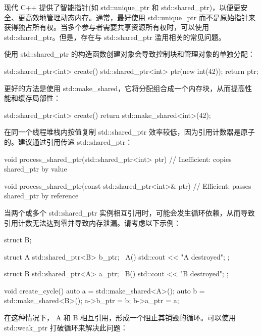 
现代 C++ 提供了智能指针(如 std::unique\_ptr 和 std::shared\_ptr)，以便更安全、更高效地管理动态内存。通常，最好使用 std::unique\_ptr 而不是原始指针来获得独占所有权。当多个参与者需要共享资源所有权时，可以使用 std::shared\_ptr。但是，存在与 std::shared\_ptr 滥用相关的常见问题。


使用 std::shared\_ptr 的构造函数创建对象会导致控制块和管理对象的单独分配：

\begin{cpp}
std::shared_ptr<int> create() {
    std::shared_ptr<int> ptr(new int(42));
    return ptr;
}
\end{cpp}

更好的方法是使用 std::make\_shared，它将分配组合成一个内存块，从而提高性能和缓存局部性：

\begin{cpp}
std::shared_ptr<int> create() {
    return std::make_shared<int>(42);
}
\end{cpp}


在同一个线程堆栈内按值复制 std::shared\_ptr 效率较低，因为引用计数器是原子的。建议通过引用传递 std::shared\_ptr：

\begin{cpp}
void process_shared_ptr(std::shared_ptr<int> ptr) {
    // Inefficient: copies shared_ptr by value
}

void process_shared_ptr(const std::shared_ptr<int>& ptr) {
    // Efficient: passes shared_ptr by reference
}
\end{cpp}


当两个或多个 std::shared\_ptr 实例相互引用时，可能会发生循环依赖，从而导致引用计数无法达到零并导致内存泄漏。请考虑以下示例：

\begin{cpp}
struct B;

struct A {
    std::shared_ptr<B> b_ptr;
    ~A() { std::cout << "A destroyed\n"; }
};

struct B {
    std::shared_ptr<A> a_ptr;
    ~B() { std::cout << "B destroyed\n"; }
};

void create_cycle() {
    auto a = std::make_shared<A>();
    auto b = std::make_shared<B>();
    a->b_ptr = b;
    b->a_ptr = a;
}
\end{cpp}

在这种情况下， A 和 B 相互引用，形成一个阻止其销毁的循环。可以使用 std::weak\_ptr 打破循环来解决此问题：

